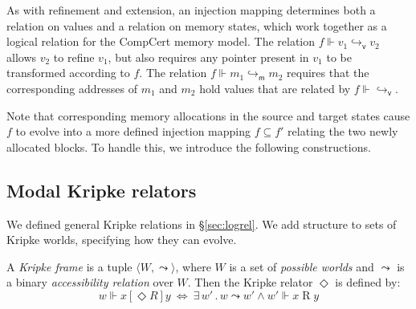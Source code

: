 \documentclass[acmsmall,authordraft]{acmart}
\newcommand{\kw}[1]{\ensuremath{ \mathsf{#1} }}
\newcommand{\ifr}[1]{\mathrel{[{#1}]}}
\begin{document}
As with refinement and extension,
an injection mapping determines both
a relation on values and
a relation on memory states,
which work together
as a logical relation for the CompCert memory model.
The relation $f \Vdash v_1 \hookrightarrow_\kw{v} v_2$
allows $v_2$ to refine $v_1$,
but also requires any pointer present in $v_1$ 
to be transformed according to $f$.
The relation $f \Vdash m_1 \hookrightarrow_\kw{m} m_2$
requires that the corresponding addresses of $m_1$ and $m_2$
hold values that are related by $f \Vdash {\hookrightarrow_\kw{v}}$.

Note that corresponding memory allocations
in the source and target states cause $f$ to
evolve into a more defined injection mapping $f \subseteq f'$
relating the two newly allocated blocks.
To handle this,
we introduce the following constructions.


\subsection{Modal Kripke relators} %

We defined general Kripke relations in \S\ref{sec:logrel}.
We add structure to sets of Kripke worlds,
specifying how they can evolve.

\begin{definition} %
A \emph{Kripke frame} is a tuple
$\langle W, {\leadsto} \rangle$, where
$W$ is a set of \emph{possible worlds} and
$\leadsto$ is a
binary \emph{accessibility relation} over $W$.
Then the Kripke relator $\Diamond$ is defined by:
\[
  w \Vdash x \ifr{\Diamond R} y \: \Leftrightarrow \:
    \exists \, w' \,.\, w \leadsto w' \wedge
      w' \Vdash x \mathrel{R} y
\]
\end{definition}
\end{document}
